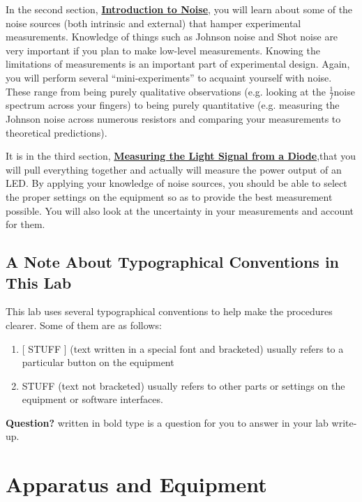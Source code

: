 \documentclass{../lab}
\begin{document}
In the second section, \href{https://berkeley-physics111b.github.io/appendices/IntroductiontoNoise/}{\textbf{Introduction to Noise}}, you will learn about some of the noise sources (both intrinsic and external) that hamper experimental measurements. Knowledge of things such as Johnson noise and Shot noise are very important if you plan to make low-level measurements. Knowing the limitations of measurements is an important part of experimental design. Again, you will perform several ``mini-experiments'' to acquaint yourself with noise. These range from being purely qualitative observations (e.g. looking at the $ \frac{1}{f} $noise spectrum across your fingers) to being purely quantitative (e.g. measuring the Johnson noise across numerous resistors and comparing your measurements to theoretical predictions).

It is in the third section, \href{https://berkeley-physics111b.github.io/appendices/LightSignal/}{\textbf{Measuring the Light Signal from a Diode}},that you will pull everything together and actually will measure the power output of an LED. By applying your knowledge of noise sources, you should be able to select the proper settings on the equipment so as to provide the best measurement possible. You will also look at the uncertainty in your measurements and account for them.

\subsection{A Note About Typographical Conventions in This Lab}

This lab uses several typographical conventions to help make the procedures clearer. Some of them are as follows:

\begin{enumerate}
    \item {[ STUFF ]} (text written in a special font and bracketed) usually refers to a particular button on the equipment

    \item STUFF (text not bracketed) usually refers to other parts or settings on the equipment or software interfaces.

\end{enumerate}

\textbf{Question?} written in bold type is a question for you to answer in your lab write-up.

\section{Apparatus and Equipment}
\label{sec:Apparatus and Equipment}
\end{document}
